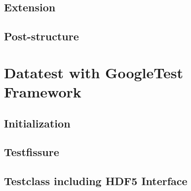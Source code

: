 \documentclass{article}
\begin{document}
\subsection{Extension}
\subsection{Post-structure}



\section{Datatest with GoogleTest Framework}
\subsection{Initialization}
\subsection{Testfissure}
\subsection{Testclass including HDF5 Interface}






\end{document}
